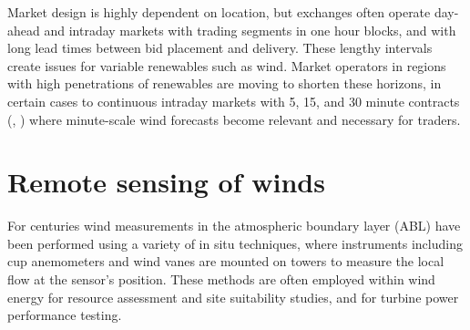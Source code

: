 Market design is highly dependent on location, but exchanges often operate day-ahead and intraday markets with trading segments in one hour blocks, and with long lead times between bid placement and delivery. These lengthy intervals create issues for variable renewables such as wind. Market operators in regions with high penetrations of renewables are moving to shorten these horizons, in certain cases to continuous intraday markets with 5, 15, and 30 minute contracts (\cite{epex_spot_se_continuous_2019}, \cite{aemc_five_2017}) where minute-scale wind forecasts become relevant and necessary for traders.

\clearpage
\section{Remote sensing of winds}
\label{intro_remote_sensing}

For centuries wind measurements in the atmospheric boundary layer (ABL) have been performed using a variety of in situ techniques, where instruments including cup anemometers and wind vanes are mounted on towers to measure the local flow at the sensor's position. These methods are often employed within wind energy for resource assessment and site suitability studies, and for turbine power performance testing.

